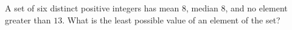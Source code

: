 A set of six distinct positive integers has mean $8$, median $8$, and no element greater than $13$. What is the least possible value of an element of the set?
